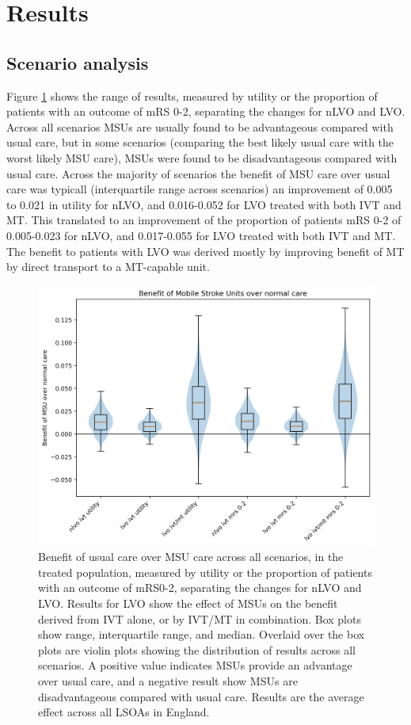 \section{Results}

\subsection{Scenario analysis}

Figure \ref{fig:scenarios_overview} shows the range of results, measured by utility or the proportion of patients with an outcome of mRS 0-2, separating the changes for nLVO and LVO. Across all scenarios MSUs are usually found to be advantageous compared with usual care, but in some scenarios (comparing the best likely usual care with the worst likely MSU care), MSUs were found to be disadvantageous compared with usual care. Across the majority of scenarios the benefit of MSU care over usual care was typicall (interquartile range across scenarios) an improvement of 0.005 to 0.021 in utility for nLVO, and 0.016-0.052 for LVO treated with both IVT and MT. This translated to an improvement of the proportion of patients mRS 0-2 of 0.005-0.023 for nLVO, and 0.017-0.055 for LVO treated with both IVT and MT. The benefit to patients with LVO was derived mostly by improving benefit of MT by direct transport to a MT-capable unit.


\begin{figure}[h]
    \centering
    \includegraphics[width=0.6\linewidth]{images/scenario_results_summary.png}
    \caption{Benefit of usual care over MSU care across all scenarios, in the treated population, measured by utility or the proportion of patients with an outcome of mRS0-2, separating the changes for nLVO and LVO. Results for LVO show the effect of MSUs on the benefit derived from IVT alone, or by IVT/MT in combination. Box plots show range, interquartile range, and median. Overlaid over the box plots are violin plots showing the distribution of results across all scenarios. A positive value indicates MSUs provide an advantage over usual care, and a negative result show MSUs are disadvantageous compared with usual care. Results are the average effect across all LSOAs in England.}
    \label{fig:scenarios_overview}
\end{figure}

